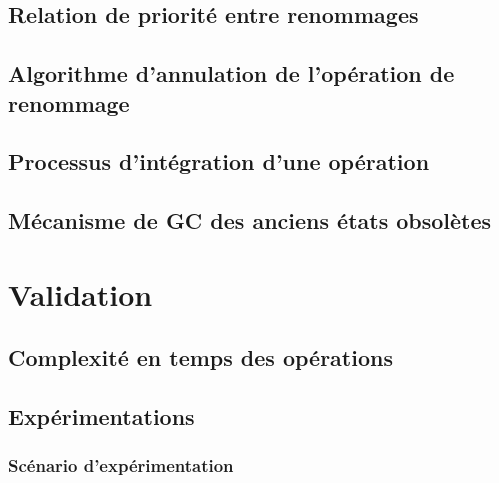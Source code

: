 \subsection{Relation de priorité entre renommages}


\subsection{Algorithme d'annulation de l'opération de renommage}


\subsection{Processus d'intégration d'une opération}


\subsection{Mécanisme de \ac{GC} des anciens états obsolètes}


\section{Validation}


\subsection{Complexité en temps des opérations}


\subsection{Expérimentations}


\subsubsection{Scénario d'expérimentation}



